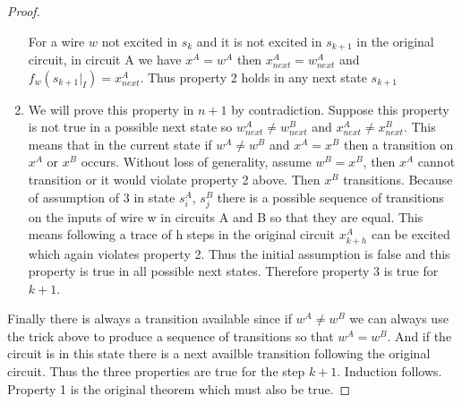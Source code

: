 \documentclass{article}
\begin{document}
\begin{proof}
\begin{enumerate}
For a wire $w$ not excited in $s_k$ and it is not excited in $s_{k+1}$ in the original circuit, in circuit A we have $x^A=w^A$ then $x_{next}^A=w_{next}^A$ and $f_w(s_{k+1}|_I)= x_{next}^A$.  Thus property 2 holds in any next state $s_{k+1}$
\item  We will prove this property in $n+1$ by contradiction. Suppose this property is not true in a possible next state so $w_{next}^A\neq w_{next}^B$ and $x_{next}^A\neq x_{next}^B$.  This means that in the current state if $w^A \neq w^B$ and $x^A=x^B$ then a transition on $x^A$ or $x^B$ occurs.  Without loss of generality, assume $w^B=x^B$, then $x^A$ cannot transition or it would violate property 2 above.  Then $x^B$ transitions.  Because of assumption of 3 in state $s_i^A$, $s_j^B$ there is a possible sequence of transitions on the inputs of wire w in circuits A and B so that they are equal.  This means following a trace of h steps in the original circuit  $x_{k+h}^A$ can be excited which again violates property 2.  Thus the initial assumption is false and this property is true in all possible next states.  Therefore property 3 is true for $k+1$.
\end{enumerate}
Finally there is always a transition available since if $w^A\neq w^B$ we can always use the trick above to produce a sequence of transitions so that $w^A= w^B$.  And if the circuit is in this state there is a next availble transition following the original circuit.  Thus the three properties are true for the step $k+1$.  Induction follows. Property 1 is the original theorem which must also be true.%
\end{proof}
\end{document}
